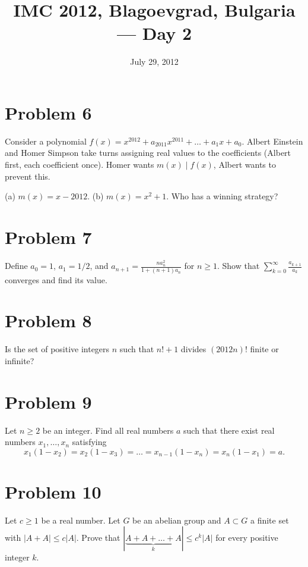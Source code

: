 \documentclass{article}
\title{IMC 2012, Blagoevgrad, Bulgaria --- Day 2}
\date{July 29, 2012}
\begin{document}
\maketitle

\section*{Problem 6}
Consider a polynomial $f(x) = x^{2012} + a_{2011} x^{2011} + \dots + a_1 x + a_0$. Albert Einstein and Homer Simpson take turns assigning real values to the coefficients (Albert first, each coefficient once). Homer wants $m(x) \mid f(x)$, Albert wants to prevent this.

(a) $m(x) = x - 2012$. (b) $m(x) = x^2 + 1$. Who has a winning strategy?

\section*{Problem 7}
Define $a_0 = 1$, $a_1 = 1/2$, and $a_{n+1} = \frac{n a_n^2}{1 + (n+1) a_n}$ for $n \ge 1$. Show that $\sum_{k=0}^\infty \frac{a_{k+1}}{a_k}$ converges and find its value.

\section*{Problem 8}
Is the set of positive integers $n$ such that $n! + 1$ divides $(2012 n)!$ finite or infinite?

\section*{Problem 9}
Let $n \ge 2$ be an integer. Find all real numbers $a$ such that there exist real numbers $x_1, \dots, x_n$ satisfying
\[ x_1(1-x_2) = x_2(1-x_3) = \dots = x_{n-1}(1-x_n) = x_n(1-x_1) = a. \]

\section*{Problem 10}
Let $c \ge 1$ be a real number. Let $G$ be an abelian group and $A \subset G$ a finite set with $|A+A| \le c|A|$. Prove that $|\underbrace{A + A + \dots + A}_{k}| \le c^k |A|$ for every positive integer $k$.
\end{document}
